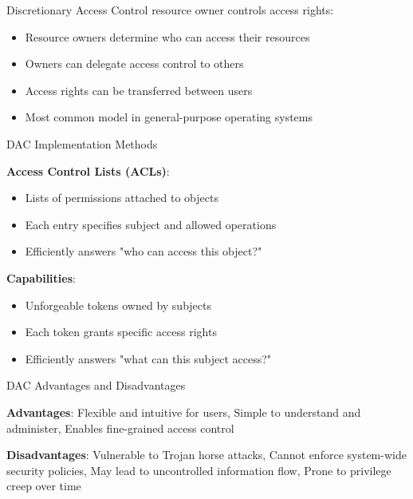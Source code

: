 \begin{definition}{Discretionary Access Control}
    resource owner controls access rights:
\begin{itemize}
    \item Resource owners determine who can access their resources
    \item Owners can delegate access control to others
    \item Access rights can be transferred between users
    \item Most common model in general-purpose operating systems
\end{itemize}
\end{definition}

\begin{concept}{DAC Implementation Methods}

    \textbf{Access Control Lists (ACLs)}:
    \begin{itemize}
        \item Lists of permissions attached to objects
        \item Each entry specifies subject and allowed operations
        \item Efficiently answers "who can access this object?"
    \end{itemize}

    \textbf{Capabilities}:
    \begin{itemize}
        \item Unforgeable tokens owned by subjects
        \item Each token grants specific access rights
        \item Efficiently answers "what can this subject access?"
    \end{itemize}

\end{concept}

\begin{theorem}{DAC Advantages and Disadvantages}

    \textbf{Advantages}:
    Flexible and intuitive for users, 
    Simple to understand and administer,
    Enables fine-grained access control

    \textbf{Disadvantages}:
    Vulnerable to Trojan horse attacks,
    Cannot enforce system-wide security policies,
    May lead to uncontrolled information flow,
    Prone to privilege creep over time

\end{theorem}

